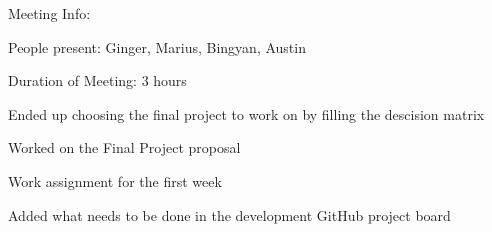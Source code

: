 Meeting Info\+:

People present\+: Ginger, Marius, Bingyan, Austin

Duration of Meeting\+: 3 hours


\begin{DoxyEnumerate}
\item Ended up choosing the final project to work on by filling the descision matrix
\item Worked on the Final Project proposal
\item Work assignment for the first week
\item Added what needs to be done in the development Git\+Hub project board 
\end{DoxyEnumerate}